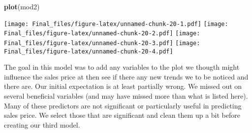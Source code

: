 \documentclass[
]{article}
\newenvironment{Shaded}{\begin{snugshade}}{\end{snugshade}}
\newcommand{\KeywordTok}[1]{\textcolor[rgb]{0.13,0.29,0.53}{\textbf{#1}}}
\newcommand{\NormalTok}[1]{#1}
\begin{document}
\begin{Shaded}
\begin{Highlighting}[]
\KeywordTok{plot}\NormalTok{(mod2)}
\end{Highlighting}
\end{Shaded}

\texttt{[image: Final\_files/figure-latex/unnamed-chunk-20-1.pdf]}
\texttt{[image: Final\_files/figure-latex/unnamed-chunk-20-2.pdf]}
\texttt{[image: Final\_files/figure-latex/unnamed-chunk-20-3.pdf]}
\texttt{[image: Final\_files/figure-latex/unnamed-chunk-20-4.pdf]}

The goal in this model was to add any variables to the plot we thougth
might influence the sales price at then see if there any new trends we
to be noticed and there are. Our initial expectation is at least
partially wrong. We missed out on several beneficial variables (and may
have missed more than what is listed here). Many of these predictors are
not significant or particularly useful in predicting sales price. We
select those that are significant and clean them up a bit before
creating our third model.
\end{document}
